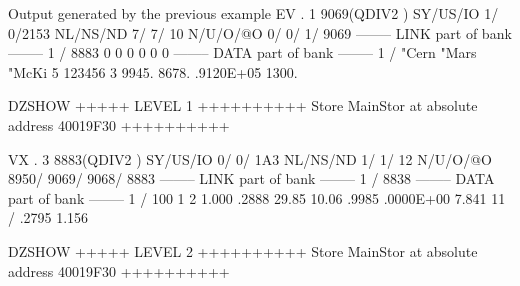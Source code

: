 \begin{landscapebody}
\begin{XMPt}{Output generated by the previous example}
 EV  .     1     9069(QDIV2   ) SY/US/IO    1/    0/2153 NL/NS/ND    7/    7/      10 N/U/O/@O       0/       0/       1/    9069
--------  LINK part of bank  --------                                                                                            
      1 /        8883           0           0           0           0           0           0                                    
--------  DATA part of bank  --------                                                                                            
      1 /       "Cern       "Mars       "McKi           5      123456           3   9945.       8678.       .9120E+05   1300.    
                                                                                                                                 
DZSHOW  +++++ LEVEL     1 ++++++++++            Store  MainStor at absolute address 40019F30      ++++++++++                     
                                                                                                                                 
 VX  .     3     8883(QDIV2   ) SY/US/IO    0/    0/ 1A3 NL/NS/ND    1/    1/      12 N/U/O/@O    8950/    9069/    9068/    8883
--------  LINK part of bank  --------                                                                                            
      1 /        8838                                                                                                            
--------  DATA part of bank  --------                                                                                            
      1 /         100           1           2   1.000       .2888       29.85       10.06       .9985       .0000E+00   7.841    
     11 /   .2795       1.156                                                                                                    
                                                                                                                                 
DZSHOW  +++++ LEVEL     2 ++++++++++            Store  MainStor at absolute address 40019F30      ++++++++++                     
                                                                                                                                 

\end{XMPt}
\end{landscapebody}
